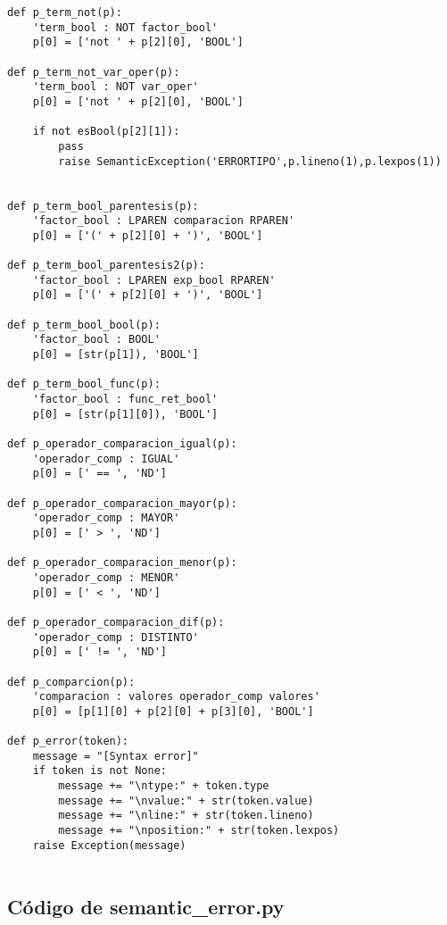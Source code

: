 \begin{verbatim}
def p_term_not(p):
    'term_bool : NOT factor_bool'
    p[0] = ['not ' + p[2][0], 'BOOL']

def p_term_not_var_oper(p):
    'term_bool : NOT var_oper'
    p[0] = ['not ' + p[2][0], 'BOOL']

    if not esBool(p[2][1]):
        pass
        raise SemanticException('ERRORTIPO',p.lineno(1),p.lexpos(1))


def p_term_bool_parentesis(p):
    'factor_bool : LPAREN comparacion RPAREN'
    p[0] = ['(' + p[2][0] + ')', 'BOOL']

def p_term_bool_parentesis2(p):
    'factor_bool : LPAREN exp_bool RPAREN'
    p[0] = ['(' + p[2][0] + ')', 'BOOL']

def p_term_bool_bool(p):
    'factor_bool : BOOL'
    p[0] = [str(p[1]), 'BOOL']

def p_term_bool_func(p):
    'factor_bool : func_ret_bool'
    p[0] = [str(p[1][0]), 'BOOL']

def p_operador_comparacion_igual(p):
    'operador_comp : IGUAL'
    p[0] = [' == ', 'ND']

def p_operador_comparacion_mayor(p):
    'operador_comp : MAYOR'
    p[0] = [' > ', 'ND']

def p_operador_comparacion_menor(p):
    'operador_comp : MENOR'
    p[0] = [' < ', 'ND']

def p_operador_comparacion_dif(p):
    'operador_comp : DISTINTO'
    p[0] = [' != ', 'ND']

def p_comparcion(p):
    'comparacion : valores operador_comp valores'
    p[0] = [p[1][0] + p[2][0] + p[3][0], 'BOOL']

def p_error(token):
    message = "[Syntax error]"
    if token is not None:
        message += "\ntype:" + token.type
        message += "\nvalue:" + str(token.value)
        message += "\nline:" + str(token.lineno)
        message += "\nposition:" + str(token.lexpos)
    raise Exception(message)


\end{verbatim}



\subsection{Código de semantic\_error.py}

